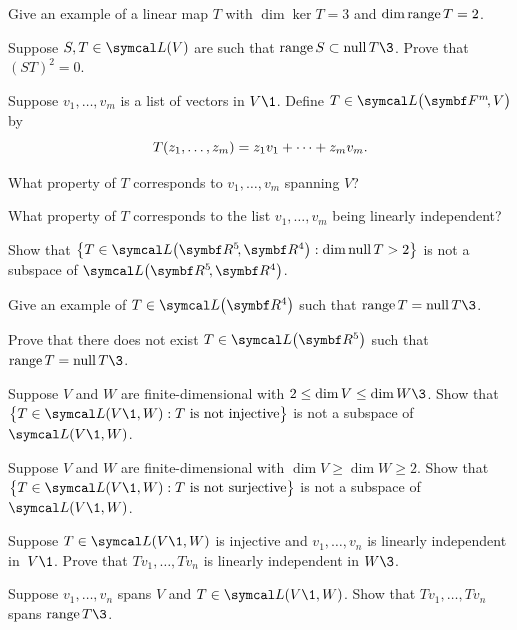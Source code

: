 \begin{exercises}

\exercise
Give an example of a linear map $T$ with $\dim \ker T = 3$ and $\dim \operatorname{range} T = 2$.


\exercise
Suppose $S, T \in \L(V)$ are such that
$
\ran S \subset \ker T\3$.
Prove that $(ST)^2 = 0$.


\exercise
Suppose $v_1, \dots, v_m$ is a list of vectors in $V\1$.  Define $T \in \L\paren[\big]{\FF{m}, V}$ by
\[ \addtolength{\belowdisplayskip}{-3bp}
T(z_1, \dots, z_m) = z_1 v_1 + \dots + z_m v_m.
\]
\begin{subtheorem}
\item
What property of $T$ corresponds to $v_1, \dots, v_m$ spanning $V$?
\item
What property of $T$ corresponds to the list $v_1, \dots, v_m$ being linearly \mbox{independent}?
\end{subtheorem}
\exercisesubtheoremend


\exercise
Show that
$
\br[\big]{T \in \L\paren[\big]{\RR{5}, \R4}: \dim \ker T > 2}
$
is not a subspace of $ \L\paren[\big]{\RR{5}, \R4}$.


\exercise
Give an example of $T \in \L\paren[\big]{\R{4}}$ such that $\ran T = \ker T\3$.


\exercise
Prove that there does not exist $T \in \L\paren[\big]{\R{5}}$ such that $\ran T = \ker T\3$.


\exercise
Suppose $V$ and $W$ are finite-dimensional with $2 \le \dim V \le \dim W\3$. Show that
$
\br[\big]{ T \in \L(V\1, W) : T \text{ is not injective} }
$
is not a subspace of $\L(V\1, W)$.


\exercise
Suppose $V$ and $W$ are finite-dimensional with $\dim V \ge \dim W \ge 2$. Show that
$
\br[\big]{ T \in \L(V\1, W) : T \text{ is not surjective} }
$
is not a subspace of $\L(V\1, W)$.


\exercise
Suppose $T \in \L(V\1,W)$ is injective and $v_1, \dots, v_n$ is linearly independent in~$V\1$.  Prove that $Tv_1, \dots, Tv_n$ is linearly independent in $W\3$.\label{3001}


\exercise
Suppose $v_1, \dots, v_n$ spans $V$ and $T \in \L(V\1,W)$. Show
that $Tv_1, \dots, Tv_n$ spans $\ran T\3$.\label{3spanrange}

\end{exercises}
